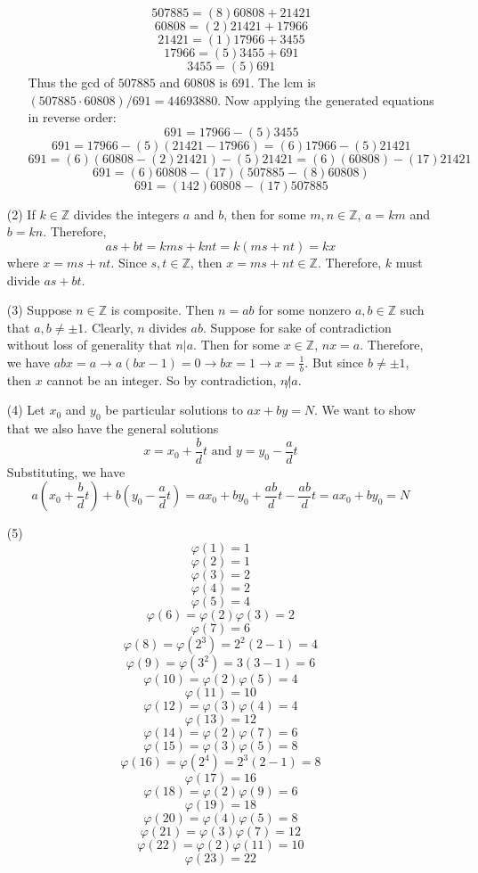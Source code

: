 \documentclass[12pt]{article}
\begin{document}
\begin{itemize}
\begin{itemize}
$$507885 = (8)60808 + 21421$$
$$60808 = (2)21421 + 17966$$
$$21421 = (1)17966 + 3455$$
$$17966 = (5)3455 + 691$$
$$3455 = (5)691$$
Thus the gcd of $507885$ and $60808$ is 691. The lcm is $(507885 \cdot 60808) / 691 = 44693880$. Now applying the generated equations in reverse order:
$$691 = 17966 - (5)3455$$
$$691 = 17966 - (5)(21421 - 17966) = (6)17966 - (5)21421$$
$$691 = (6)(60808 - (2)21421) - (5)21421 = (6)(60808) - (17)21421$$
$$691 = (6)60808 - (17)(507885 - (8)60808)$$
$$691 = (142)60808 - (17)507885$$
\end{itemize}
\item[(2)]
If $k \in \mathbb{Z}$ divides the integers $a$ and $b$, then for some $m, n \in \mathbb{Z}$, $a = km$ and $b = kn$. Therefore,
$$as + bt = kms + knt = k(ms + nt) = kx$$
where $x = ms + nt$. Since $s, t \in \mathbb{Z}$, then $x = ms + nt \in \mathbb{Z}$. Therefore, $k$ must divide $as + bt$.
\item[(3)]
Suppose $n \in \mathbb{Z}$ is composite. Then $n = ab$ for some nonzero $a, b \in \mathbb{Z}$ such that $a, b \neq \pm 1$. Clearly, $n$ divides $ab$. Suppose for sake of contradiction without loss of generality that $n | a$. Then for some $x \in \mathbb{Z}$, $nx = a$. Therefore, we have $abx = a \rightarrow a(bx - 1) = 0 \rightarrow bx = 1 \rightarrow x = \frac{1}{b}$. But since $b \neq \pm 1$, then $x$ cannot be an integer. So by contradiction, $n \not | a$.
\item[(4)]
Let $x_0$ and $y_0$ be particular solutions to $ax + by = N$. We want to show that we also have the general solutions
$$x = x_0 + \frac{b}{d}t \text{ and } y = y_0 - \frac{a}{d}t$$
Substituting, we have
$$a\left(x_0 + \frac{b}{d}t\right) + b\left(y_0 - \frac{a}{d}t\right) = ax_0 + by_0 + \frac{ab}{d}t - \frac{ab}{d}t = ax_0 + by_0 = N$$
\item[(5)]
$$\varphi(1) = 1$$
$$\varphi(2) = 1$$
$$\varphi(3) = 2$$
$$\varphi(4) = 2$$
$$\varphi(5) = 4$$
$$\varphi(6) = \varphi(2)\varphi(3) = 2$$
$$\varphi(7) = 6$$
$$\varphi(8) = \varphi(2^3) = 2^2(2 - 1) = 4$$
$$\varphi(9) = \varphi(3^2) = 3(3 - 1) = 6$$
$$\varphi(10) = \varphi(2)\varphi(5) = 4$$
$$\varphi(11) = 10$$
$$\varphi(12) = \varphi(3)\varphi(4) = 4$$
$$\varphi(13) = 12$$
$$\varphi(14) = \varphi(2)\varphi(7) = 6$$
$$\varphi(15) = \varphi(3)\varphi(5) = 8$$
$$\varphi(16) = \varphi(2^4) = 2^3(2 - 1) = 8$$
$$\varphi(17) = 16$$
$$\varphi(18) = \varphi(2)\varphi(9) = 6$$
$$\varphi(19) = 18$$
$$\varphi(20) = \varphi(4)\varphi(5) = 8$$
$$\varphi(21) = \varphi(3)\varphi(7) = 12$$
$$\varphi(22) = \varphi(2)\varphi(11) = 10$$
$$\varphi(23) = 22$$

\end{itemize}
\end{document}
